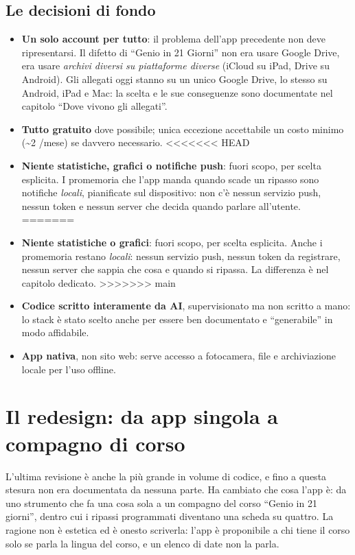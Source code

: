 \documentclass[11pt,a4paper]{report}
\begin{document}
\section{Le decisioni di fondo}

\begin{itemize}[nosep]
  \item \textbf{Un solo account per tutto}: il problema dell'app precedente
        non deve ripresentarsi. Il difetto di ``Genio in 21 Giorni'' non era
        usare Google Drive, era usare \emph{archivi diversi su piattaforme
        diverse} (iCloud su iPad, Drive su Android). Gli allegati oggi
        stanno su un unico Google Drive, lo stesso su Android, iPad e Mac:
        la scelta e le sue conseguenze sono documentate nel capitolo
        ``Dove vivono gli allegati''.
  \item \textbf{Tutto gratuito} dove possibile; unica eccezione accettabile
        un costo minimo (\textasciitilde 2 \texteuro{}/mese) se davvero necessario.
<<<<<<< HEAD
  \item \textbf{Niente statistiche, grafici o notifiche push}: fuori scopo,
        per scelta esplicita. I promemoria che l'app manda quando scade un
        ripasso sono notifiche \emph{locali}, pianificate sul dispositivo:
        non c'\`e nessun servizio push, nessun token e nessun server che
        decida quando parlare all'utente.
=======
  \item \textbf{Niente statistiche o grafici}: fuori scopo, per scelta
        esplicita. Anche i promemoria restano \emph{locali}: nessun servizio
        push, nessun token da registrare, nessun server che sappia che cosa e
        quando si ripassa. La differenza \`e nel capitolo dedicato.
>>>>>>> main
  \item \textbf{Codice scritto interamente da AI}, supervisionato ma non
        scritto a mano: lo stack \`e stato scelto anche per essere ben
        documentato e ``generabile'' in modo affidabile.
  \item \textbf{App nativa}, non sito web: serve accesso a fotocamera,
        file e archiviazione locale per l'uso offline.
\end{itemize}

\chapter{Il redesign: da app singola a compagno di corso}
\label{sec:redesign}

L'ultima revisione \`e anche la pi\`u grande in volume di codice, e fino a
questa stesura non era documentata da nessuna parte. Ha cambiato che cosa
l'app \`e: da uno strumento che fa una cosa sola a un compagno del corso
``Genio in 21 giorni'', dentro cui i ripassi programmati diventano una scheda
su quattro. La ragione non \`e estetica ed \`e onesto scriverla: l'app \`e
proponibile a chi tiene il corso solo se parla la lingua del corso, e un
elenco di date non la parla.
\end{document}
